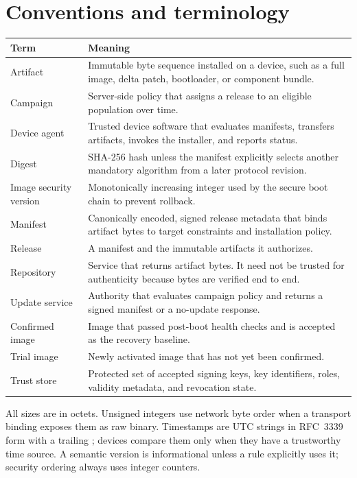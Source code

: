 \section{Conventions and terminology}

\begin{longtable}{@{}L{35mm}L{116mm}@{}}
  \toprule
  \textbf{Term} & \textbf{Meaning} \\
  \midrule
  \endhead
  Artifact & Immutable byte sequence installed on a device, such as a full image,
             delta patch, bootloader, or component bundle. \\
  Campaign & Server-side policy that assigns a release to an eligible population
             over time. \\
  Device agent & Trusted device software that evaluates manifests, transfers
                 artifacts, invokes the installer, and reports status. \\
  Digest & SHA-256 hash unless the manifest explicitly selects another mandatory
           algorithm from a later protocol revision. \\
  Image security version & Monotonically increasing integer used by the secure
                           boot chain to prevent rollback. \\
  Manifest & Canonically encoded, signed release metadata that binds artifact
             bytes to target constraints and installation policy. \\
  Release & A manifest and the immutable artifacts it authorizes. \\
  Repository & Service that returns artifact bytes. It need not be trusted for
               authenticity because bytes are verified end to end. \\
  Update service & Authority that evaluates campaign policy and returns a signed
                   manifest or a no-update response. \\
  Confirmed image & Image that passed post-boot health checks and is accepted as
                    the recovery baseline. \\
  Trial image & Newly activated image that has not yet been confirmed. \\
  Trust store & Protected set of accepted signing keys, key identifiers, roles,
                validity metadata, and revocation state. \\
  \bottomrule
\end{longtable}

All sizes are in octets. Unsigned integers use network byte order when a transport
binding exposes them as raw binary. Timestamps are UTC strings in RFC~3339 form
with a trailing ; devices compare them only when they have a trustworthy
time source. A semantic version is informational unless a rule explicitly uses
it; security ordering always uses integer counters.

